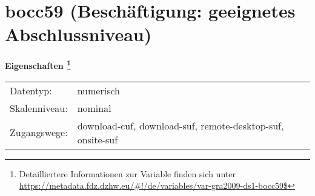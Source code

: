 
    \setcounter{footnote}{0}

    \vspace*{-1.8cm}
	\section{bocc59 (Beschäftigung: geeignetes Abschlussniveau)}
	\label{section:bocc59}



    \vspace*{0.5cm}
    \noindent\textbf{Eigenschaften
	\footnote{Detailliertere Informationen zur Variable finden sich unter
		\url{https://metadata.fdz.dzhw.eu/\#!/de/variables/var-gra2009-ds1-bocc59$}}}\\
	\begin{tabularx}{\hsize}{@{}lX}
	Datentyp: & numerisch \\
	Skalenniveau: & nominal \\
	Zugangswege: &
	  download-cuf, 
	  download-suf, 
	  remote-desktop-suf, 
	  onsite-suf
 \\
    \end{tabularx}



